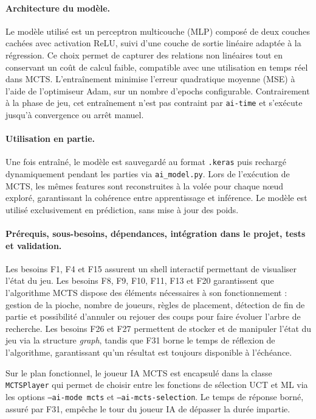 \documentclass[11pt]{article}
\begin{document}
\paragraph{Architecture du modèle.}
Le modèle utilisé est un perceptron multicouche (MLP) composé de deux 
couches cachées avec activation ReLU, suivi d'une couche de sortie 
linéaire adaptée à la régression. Ce choix permet de capturer des 
relations non linéaires tout en conservant un coût de calcul faible, 
compatible avec une utilisation en temps réel dans MCTS. 
L'entraînement minimise l'erreur quadratique moyenne (MSE) à l'aide 
de l'optimiseur Adam, sur un nombre d'epochs configurable. 
Contrairement à la phase de jeu, cet entraînement n'est pas contraint 
par \texttt{ai-time} et s'exécute jusqu'à convergence ou arrêt manuel.

\paragraph{Utilisation en partie.}
Une fois entraîné, le modèle est sauvegardé au format \texttt{.keras} 
puis rechargé dynamiquement pendant les parties via 
\texttt{ai\_model.py}. Lors de l'exécution de MCTS, les mêmes 
features sont reconstruites à la volée pour chaque nœud exploré, 
garantissant la cohérence entre apprentissage et inférence. Le modèle 
est utilisé exclusivement en prédiction, sans mise à jour des poids.

\paragraph{Prérequis, sous-besoins, dépendances, intégration dans le projet, tests et validation.}
Les besoins F1, F4 et F15 assurent un shell interactif permettant de 
visualiser l'état du jeu. Les besoins F8, F9, F10, F11, F13 et F20 
garantissent que l'algorithme MCTS dispose des éléments nécessaires 
à son fonctionnement : gestion de la pioche, nombre de joueurs, règles 
de placement, détection de fin de partie et possibilité d'annuler ou 
rejouer des coups pour faire évoluer l'arbre de recherche. Les besoins 
F26 et F27 permettent de stocker et de manipuler l'état du jeu via la 
structure \textit{graph}, tandis que F31 borne le temps de réflexion 
de l'algorithme, garantissant qu'un résultat est toujours disponible 
à l'échéance.

Sur le plan fonctionnel, le joueur IA MCTS est encapsulé dans la 
classe \texttt{MCTSPlayer} qui permet de choisir entre les fonctions 
de sélection UCT et ML via les options \texttt{--ai-mode mcts} et 
\texttt{--ai-mcts-selection}. Le temps de réponse borné, assuré par 
F31, empêche le tour du joueur IA de dépasser la durée impartie.
\end{document}
